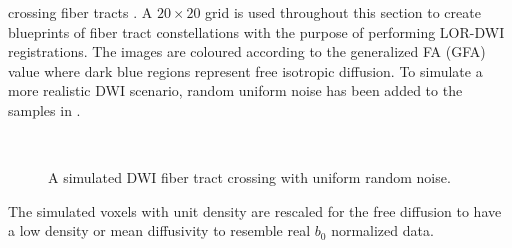 \documentclass[twocolumn]{svjour3}
\begin{document}
crossing fiber tracts . A $20\times20$ grid is used throughout
this section to create blueprints of fiber tract constellations with the purpose of
performing LOR-DWI registrations. The images are coloured according to the generalized FA
(GFA) value where dark blue regions represent free isotropic diffusion. To simulate a more
realistic DWI scenario, random uniform noise has been added to the samples in
.
\begin{figure}[!t]
  \centering
  \hspace*{-0cm}\\
  \hspace*{-0cm}
  \caption{A simulated DWI fiber tract crossing with uniform random noise.}
  \label{fig:crossingandnoise1}
\end{figure}
The simulated voxels with unit density are rescaled for the free diffusion to have a low
density or mean diffusivity to resemble real $b_0$ normalized data.
\end{document}
